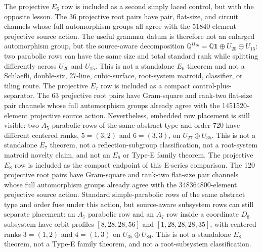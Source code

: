 The projective \(E_6\) row is included as a second simply laced control, but with the opposite lesson.  The 36 projective root pairs have pair, flat-size, and circuit channels whose full automorphism groups all agree with the 51840-element projective source action.  The useful grammar datum is therefore not an enlarged automorphism group, but the source-aware decomposition \(\mathbb Q^{\Pi_{36}}=\mathbb Q\mathbf1\oplus U_{20}\oplus U_{15}\): two parabolic rows can have the same size and total standard rank while splitting differently across \(U_{20}\) and \(U_{15}\).  This is not a standalone \(E_6\) theorem and not a Schlaefli, double-six, 27-line, cubic-surface, root-system matroid, classifier, or tiling route.
The projective \(E_7\) row is included as a compact control-plus-separator.  The 63 projective root pairs have Gram-square and rank-two flat-size pair channels whose full automorphism groups already agree with the 1451520-element projective source action.  Nevertheless, embedded row placement is still visible: two \(A_5\) parabolic rows of the same abstract type and order 720 have different centered ranks, \(5=(3,2)\) and \(6=(3,3)\), on \(U_{27}\oplus U_{35}\).  This is not a standalone \(E_7\) theorem, not a reflection-subgroup classification, not a root-system matroid novelty claim, and not an \(E_8\) or Type-E family theorem.
The projective \(E_8\) row is included as the compact endpoint of this E-series comparison.  The 120 projective root pairs have Gram-square and rank-two flat-size pair channels whose full automorphism groups already agree with the 348364800-element projective source action.  Standard simple-parabolic rows of the same abstract type and order fuse under this action, but source-aware subsystem rows can still separate placement: an \(A_7\) parabolic row and an \(A_7\) row inside a coordinate \(D_8\) subsystem have orbit profiles \([8,28,28,56]\) and \([1,28,28,28,35]\), with centered ranks \(3=(1,2)\) and \(4=(1,3)\) on \(U_{35}\oplus U_{84}\).  This is not a standalone \(E_8\) theorem, not a Type-E family theorem, and not a root-subsystem classification.

